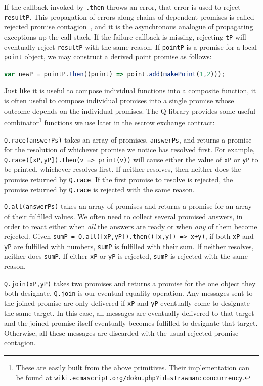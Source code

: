 \documentclass{llncs}
\newcommand{\myurl}[1]{{\href{http://#1}{\texttt{#1}}}}
\begin{document}
If the callback invoked by {\tt .then} throws an error, that error is used to reject {\tt resultP}. This propagation of errors along chains of dependent promises is called rejected promise contagion~\cite{miller:strangers}, and it is the asynchronous analogue of propagating exceptions up the call stack. If the failure callback is missing,  rejecting {\tt tP} will eventually reject {\tt resultP} with the same reason. If {\tt pointP} is a promise for a local {\tt point} object, we may construct a derived point promise as follows:

\begin{lstlisting}[language=JavaScript,numbers=none]
var newP = pointP.then((point) => point.add(makePoint(1,2)));
\end{lstlisting}

Just like it is useful to compose individual functions into a composite function, it is often useful to compose individual promises into a single promise whose outcome depends on the individual promises. The Q library provides some useful combinator\footnote{These are easily built from the above primitives. Their implementation can be found at \myurl{wiki.ecmascript.org/doku.php?id=strawman:concurrency}.} functions we use later in the escrow exchange contract:

\begin{description*}
\item[{\tt Q.race(answerPs)}] takes an array of promises, {\tt answerPs}, and returns a promise for the resolution of whichever promise we notice has resolved first. For example, {\tt Q.race([xP,yP]).then(v => print(v))} will cause either the value of {\tt xP} or {\tt yP} to be printed, whichever resolves first. If neither resolves, then neither does the promise returned by {\tt Q.race}. If the first promise to resolve is rejected, the promise returned by {\tt Q.race} is rejected with the same reason.

\item[{\tt Q.all(answerPs)}] takes an array of promises and returns a promise for an array of their fulfilled values. We often need to collect several promised answers, in order to react either when \emph{all} the answers are ready or when \emph{any} of them become rejected. Given {\tt sumP = Q.all([xP,yP]).then(([x,y]) => x+y)}, if both {\tt xP} and {\tt yP} are fulfilled with numbers, {\tt sumP} is fulfilled with their sum. If neither resolves, neither does {\tt sumP}. If either {\tt xP} or {\tt yP} is rejected, {\tt sumP} is rejected with the same reason.

\item[{\tt Q.join(xP,yP)}] takes two promises and returns a promise for the one object they both designate. {\tt Q.join} is our eventual equality operation. Any messages sent to the joined promise are only delivered if {\tt xP} and {\tt yP} eventually come to designate the same target. In this case, all messages are eventually delivered to that target and the joined promise itself eventually becomes fulfilled to designate that target. Otherwise, all these messages are discarded with the usual rejected promise contagion.
\end{description*}
\end{document}
